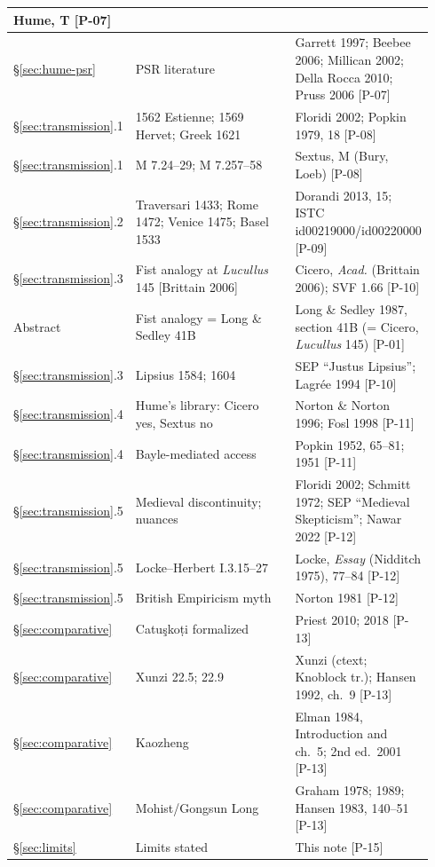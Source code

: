 \documentclass[11pt]{article}
\theoremstyle{plain}
\theoremstyle{definition}
\theoremstyle{remark}
\begin{document}
\begin{center}
\begin{longtable}{p{0.14\linewidth} p{0.48\linewidth} p{0.32\linewidth}}
Hume, T [P-07] \\
\hline
\S\ref{sec:hume-psr} &
PSR literature &
Garrett 1997; Beebee 2006; Millican 2002; Della Rocca 2010; Pruss
2006 [P-07] \\
\hline
\S\ref{sec:transmission}.1 &
1562 Estienne; 1569 Hervet; Greek 1621 &
Floridi 2002; Popkin 1979, 18 [P-08] \\
\hline
\S\ref{sec:transmission}.1 &
M 7.24--29; M 7.257--58 &
Sextus, M (Bury, Loeb) [P-08] \\
\hline
\S\ref{sec:transmission}.2 &
Traversari 1433; Rome 1472; Venice 1475; Basel 1533 &
Dorandi 2013, 15; ISTC id00219000/id00220000 [P-09] \\
\hline
\S\ref{sec:transmission}.3 &
Fist analogy at \emph{Lucullus} 145 [Brittain 2006] &
Cicero, \emph{Acad.} (Brittain 2006); SVF 1.66 [P-10] \\
\hline
Abstract &
Fist analogy = Long \& Sedley 41B &
Long \& Sedley 1987, section 41B (= Cicero, \emph{Lucullus} 145)
[P-01] \\
\hline
\S\ref{sec:transmission}.3 &
Lipsius 1584; 1604 &
SEP ``Justus Lipsius''; Lagr\'ee 1994 [P-10] \\
\hline
\S\ref{sec:transmission}.4 &
Hume's library: Cicero yes, Sextus no &
Norton \& Norton 1996; Fosl 1998 [P-11] \\
\hline
\S\ref{sec:transmission}.4 &
Bayle-mediated access &
Popkin 1952, 65--81; 1951 [P-11] \\
\hline
\S\ref{sec:transmission}.5 &
Medieval discontinuity; nuances &
Floridi 2002; Schmitt 1972; SEP ``Medieval Skepticism''; Nawar 2022
[P-12] \\
\hline
\S\ref{sec:transmission}.5 &
Locke--Herbert I.3.15--27 &
Locke, \emph{Essay} (Nidditch 1975), 77--84 [P-12] \\
\hline
\S\ref{sec:transmission}.5 &
British Empiricism myth &
Norton 1981 [P-12] \\
\hline
\S\ref{sec:comparative} &
Catu\c{s}ko\d{t}i formalized &
Priest 2010; 2018 [P-13] \\
\hline
\S\ref{sec:comparative} &
Xunzi 22.5; 22.9 &
Xunzi (ctext; Knoblock tr.); Hansen 1992, ch.~9 [P-13] \\
\hline
\S\ref{sec:comparative} &
Kaozheng &
Elman 1984, Introduction and ch.~5; 2nd ed.\ 2001 [P-13] \\
\hline
\S\ref{sec:comparative} &
Mohist/Gongsun Long &
Graham 1978; 1989; Hansen 1983, 140--51 [P-13] \\
\hline
\S\ref{sec:limits} &
Limits stated &
This note [P-15] \\
\hline
\end{longtable}
\end{center}
\end{document}
